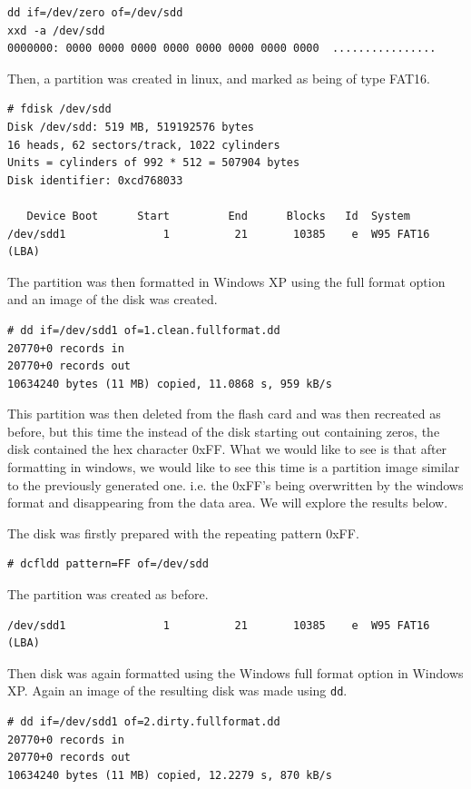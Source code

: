 \documentclass[a4paper,
    11pt,
    normalheadings,
    parindent,
    UKenglish,
    abstracton,
    ]{scrartcl}
\begin{document}
\begin{verbatim}
dd if=/dev/zero of=/dev/sdd
xxd -a /dev/sdd
0000000: 0000 0000 0000 0000 0000 0000 0000 0000  ................
\end{verbatim}

Then, a partition was created in linux, and marked as being of type FAT16.
\begin{verbatim}
# fdisk /dev/sdd
Disk /dev/sdd: 519 MB, 519192576 bytes
16 heads, 62 sectors/track, 1022 cylinders
Units = cylinders of 992 * 512 = 507904 bytes
Disk identifier: 0xcd768033

   Device Boot      Start         End      Blocks   Id  System
/dev/sdd1               1          21       10385    e  W95 FAT16 (LBA)
\end{verbatim}

The partition was then formatted in Windows XP using the full format option and an image of the disk was created.
\begin{verbatim}
# dd if=/dev/sdd1 of=1.clean.fullformat.dd
20770+0 records in
20770+0 records out
10634240 bytes (11 MB) copied, 11.0868 s, 959 kB/s
\end{verbatim}

This partition was then deleted from the flash card and was then recreated as before, but this time the instead of the disk starting out containing zeros, the disk contained the hex character 0xFF. What we would like to see is that after formatting in windows, we would like to see this time is a partition image similar to the previously generated one. i.e. the 0xFF's being overwritten by the windows format and disappearing from the data area. We will explore the results below.

The disk was firstly prepared with the repeating pattern 0xFF.
\begin{verbatim}
# dcfldd pattern=FF of=/dev/sdd
\end{verbatim}

The partition was created as before.
\begin{verbatim}
/dev/sdd1               1          21       10385    e  W95 FAT16 (LBA)
\end{verbatim}

Then disk was again formatted using the Windows full format option in Windows XP. Again an image of the resulting disk was made using \texttt{dd}.

\begin{verbatim}
# dd if=/dev/sdd1 of=2.dirty.fullformat.dd
20770+0 records in
20770+0 records out
10634240 bytes (11 MB) copied, 12.2279 s, 870 kB/s
\end{verbatim}
\end{document}
